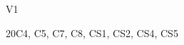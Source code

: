 \begin{syllabus}
	\begin{competences}{V1}
		\item {} 
		\item {} 
		\item {}
		\item {}
		\item {}
		\item {}
		\item {}
		\item {}
		\item {}
		\item {}
		\item {}
	\end{competences}
	
	\begin{unit}{\SESoftwareConstruction}{}{}{20}{C4, C5, C7, C8, CS1, CS2, CS4, CS5}
		\begin{topics}
			\item \SESoftwareConstructionTopicCoding
			\item \SESoftwareConstructionTopicCodingStandards
			\item \SESoftwareConstructionTopicIntegration
			\item \SESoftwareConstructionTopicDevelopment
			\item \SESoftwareConstructionTopicPotential
		\end{topics}
		\begin{learningoutcomes}
			\item \SESoftwareConstructionLODescribeTechniques[\Assessment]
			\item \SESoftwareConstructionLOBuild[\Assessment]
			\item \SESoftwareConstructionLODescribeSecure[\Assessment]
			\item \SESoftwareConstructionLOSelectAndDefined[\Assessment]
			\item \SESoftwareConstructionLOCompareAndStrategies[\Assessment]
			\item \SESoftwareConstructionLODescribeTheAnalyzing[\Assessment]
			\item \SESoftwareConstructionLODescribeTheAnalyzingChanges[\Assessment]
			\item \SESoftwareConstructionLORewrite[\Assessment]
			\item \SESoftwareConstructionLOWriteAThatNon[\Assessment]
		\end{learningoutcomes}
	\end{unit}
	

\end{syllabus}
